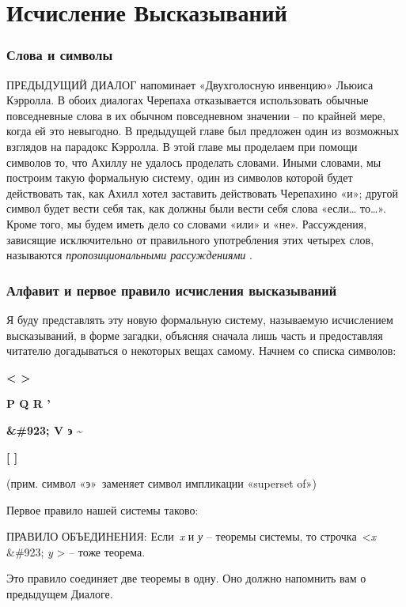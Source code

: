 \documentclass[../main.tex]{subfiles}
\begin{document}
\chapter{Исчисление Высказываний}

\subsection{Слова и символы}

ПРЕДЫДУЩИЙ ДИАЛОГ напоминает «Двухголосную инвенцию» Льюиса Кэрролла. В обоих диалогах Черепаха отказывается использовать обычные повседневные слова в их обычном повседневном значении \--- по крайней мере, когда ей это невыгодно. В предыдущей главе был предложен один из возможных взглядов на парадокс Кэрролла. В этой главе мы проделаем при помощи символов то, что Ахиллу не удалось проделать словами. Иными словами, мы построим такую формальную систему, один из символов которой будет действовать так, как Ахилл хотел заставить действовать Черепахино «и»; другой символ будет вести себя так, как должны были вести себя слова «если\ldots{} то\ldots». Кроме того, мы будем иметь дело со словами «или» и «не». Рассуждения, зависящие исключительно от правильного употребления этих четырех слов, называются \emph{пропозициональными рассуждениями} .


\subsection{Алфавит и первое правило исчисления высказываний}

Я буду представлять эту новую формальную систему, называемую исчислением высказываний, в форме загадки, объясняя сначала лишь часть и предоставляя читателю догадываться о некоторых вещах самому. Начнем со списка символов:

\textbf{\textless{} \textgreater{}}

\textbf{P Q R '}

\textbf{\&\#923; V э \textasciitilde{}}

\textbf{{[} {]}}

(прим. символ «э»~заменяет символ импликации «superset of»)

Первое правило нашей системы таково:

ПРАВИЛО ОБЪЕДИНЕНИЯ: Если~\emph{x} и \emph{у} \--- теоремы системы, то строчка~\textless{}\emph{x} \&\#923; \emph{y} \textgreater{} \--- тоже теорема.

Это правило соединяет две теоремы в одну. Оно должно напомнить вам о предыдущем Диалоге.
\end{document}
